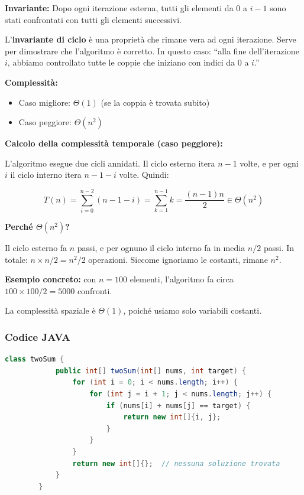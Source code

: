 \documentclass[a4paper, 11pt]{article}
\theoremstyle{definition}
\theoremstyle{remark}
\theoremstyle{remark}
\newenvironment{nota}{%
	\begin{tcolorbox}[
		colback=codebg,
		colframe=primary,
		fonttitle=\bfseries,
		title=Nota,
		left=6pt, right=6pt, top=4pt, bottom=4pt
		]
	}{%
	\end{tcolorbox}
}
\begin{document}
	\noindent\textbf{Invariante:} Dopo ogni iterazione esterna, tutti gli elementi da $0$ a $i-1$ sono stati confrontati con tutti gli elementi successivi.
	
	\begin{nota}
		L'\textbf{invariante di ciclo} è una proprietà che rimane vera ad ogni iterazione. Serve per dimostrare che l'algoritmo è corretto. In questo caso: ``alla fine dell'iterazione $i$, abbiamo controllato tutte le coppie che iniziano con indici da $0$ a $i$.''
	\end{nota}
	
	\noindent\textbf{Complessità:}
	\begin{itemize}
		\item Caso migliore: $\Theta(1)$ (se la coppia è trovata subito)
		\item Caso peggiore: $\Theta(n^2)$
	\end{itemize}
	
	\noindent\textbf{Calcolo della complessità temporale (caso peggiore):}
	
	L'algoritmo esegue due cicli annidati. Il ciclo esterno itera $n-1$ volte, e per ogni $i$ il ciclo interno itera $n-1-i$ volte. Quindi:
	
	\[
	T(n) = \sum_{i=0}^{n-2} (n-1-i) = \sum_{k=1}^{n-1} k = 	\frac{(n-1)n}{2} \in \Theta(n^2)
	\]
	
	\begin{softnote}
		\textbf{Perché $\Theta(n^2)$?}
		
		Il ciclo esterno fa $n$ passi, e per ognuno il ciclo interno fa in media $n/2$ passi. In totale: $n \times n/2 = n^2/2$ operazioni. Siccome ignoriamo le costanti, rimane $n^2$.
		
		\textbf{Esempio concreto:} con $n=100$ elementi, l'algoritmo fa circa $100 \times 100 / 2 = 5000$ confronti.
	\end{softnote}
	
	La complessità spaziale è $\Theta(1)$, poiché usiamo solo variabili costanti. 
	
	\subsubsection*{Codice JAVA}
	\begin{lstlisting}[language=Java, numbers=none, basicstyle=\ttfamily\footnotesize]
		class twoSum {
			public int[] twoSum(int[] nums, int target) {
				for (int i = 0; i < nums.length; i++) {
					for (int j = i + 1; j < nums.length; j++) {
						if (nums[i] + nums[j] == target) {
							return new int[]{i, j};
						}
					}
				}
				return new int[]{};  // nessuna soluzione trovata
			}
		}
	\end{lstlisting}
	
\end{document}
